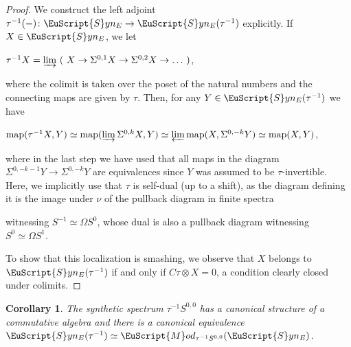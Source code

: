 \documentclass[oneside,a4paper]{amsart}
\newcommand{\euscr}[1]{\EuScript{#1}} %
\newcommand{\map}{\textnormal{map}} %
\newcommand{\synspectra}{\euscr{S}yn} %
\newcommand{\Mod}{\euscr{M}od} %
\theoremstyle{plain}
\newtheorem{cor}[thm]{Corollary}
\theoremstyle{definition}
\theoremstyle{remark}
\begin{document}
\begin{proof}
We construct the left adjoint $\tau^{-1}(-) \colon \synspectra_{E} \rightarrow \synspectra_{E}(\tau^{-1})$ explicitly. If $X \in \synspectra_{E}$, we let 

\begin{center}
$\tau^{-1}X = \varinjlim \ (\ X \rightarrow \Sigma^{0, 1} X \rightarrow \Sigma^{0, 2} X \rightarrow \ldots \ )$,
\end{center}
where the colimit is taken over the poset of the natural numbers and the connecting maps are given by $\tau$. Then, for any $Y \in \synspectra_{E}(\tau^{-1})$ we have

\begin{center}
$\map(\tau^{-1}X, Y) \simeq \map(\varinjlim \Sigma^{0, k} X, Y) \simeq \varprojlim \map(X, \Sigma^{0, -k} Y) \simeq \map(X, Y)$, 
\end{center}
where in the last step we have used that all maps in the diagram $\Sigma^{0, -k-1}Y \rightarrow \Sigma^{0, -k}Y$ are equivalences since $Y$ was assumed to be $\tau$-invertible. Here, we implicitly use that $\tau$ is self-dual (up to a shift), as the diagram defining it is the image under $\nu$ of the pullback diagram in finite spectra
\begin{center}
\end{center}
witnessing $S^{-1} \simeq \Omega S^{0}$, whose dual is also a pullback diagram witnessing $S^{0} \simeq \Omega S^{1}$. 

To show that this localization is smashing, we observe that $X$ belongs to $\synspectra_{E}(\tau^{-1})$ if and only if $C \tau \otimes X = 0$, a condition clearly closed under colimits. 
\end{proof}

\begin{cor}
The synthetic spectrum $\tau^{-1} S^{0, 0}$ has a canonical structure of a commutative algebra and there is a canonical equivalence $\synspectra_{E}(\tau^{-1}) \simeq \Mod_{\tau^{-1}S^{0,0}}(\synspectra_{E})$.
\end{cor}
\end{document}
